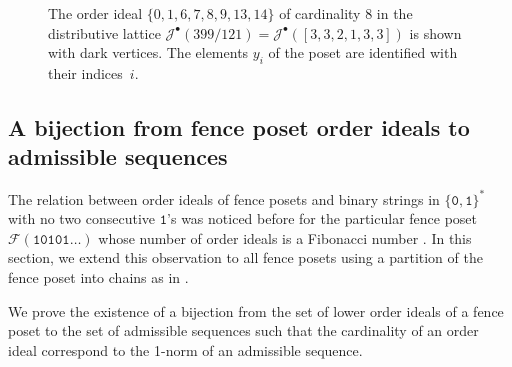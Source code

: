 \documentclass[a4paper,12pt]{amsart}
\newcommand{\Fcal}{{\mathcal{F}}}
\newcommand{\Jcal}{{\mathcal{J}}}
\newcommand{\0}{\mathtt{0}}
\newcommand{\1}{\mathtt{1}}
\newcommand{\2}{\mathtt{2}}
\newcommand{\3}{\mathtt{3}}
\begin{document}
\begin{figure}[h]
\begin{center}
\end{center}
    \caption{The order ideal $\{0,1,6,7,8,9,13,14\}$
    of cardinality $8$
    in the distributive lattice $\Jcal^\bullet(399/121)=\Jcal^\bullet([3,3,2,1,3,3])$
    is shown with dark vertices.
    The elements $y_i$ of the poset are identified with their indices~$i$.
    }
\label{fig:ideal-containing-zero}
\end{figure}




\subsection{A bijection from fence poset order ideals to admissible sequences}

The relation between order ideals of fence posets
and binary strings in $\{\0,\1\}^*$ with no two consecutive $\1$'s was noticed before
for the particular fence poset $\Fcal(\1\0\1\0\1\dots)$
whose number of order ideals is a Fibonacci number \cite{MR1948779}.
In this section, we extend this observation to all fence posets
using a partition of the fence poset into chains
as in \cite[Section 3.5]{MR2868112}.

We prove the existence of a bijection from
the set of lower order ideals of a fence poset
to the set of admissible sequences
such that the cardinality of an order ideal
correspond to the 1-norm of an admissible sequence.
\end{document}
